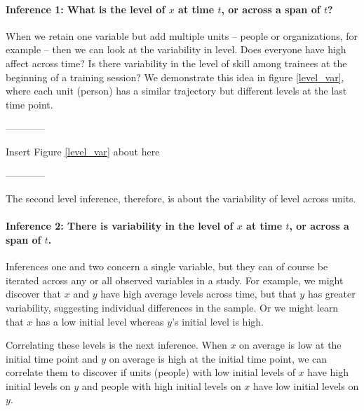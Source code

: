 \documentclass[]{article}
\let\oldparagraph\paragraph
\renewcommand{\paragraph}[1]{\oldparagraph{#1}\mbox{}}
\begin{document}
\hypertarget{inference-1-what-is-the-level-of-x-at-time-t-or-across-a-span-of-t}{%
\paragraph{\texorpdfstring{Inference 1: What is the level of \(x\) at
time \(t\), or across a span of
\(t\)?}{Inference 1: What is the level of x at time t, or across a span of t?}}\label{inference-1-what-is-the-level-of-x-at-time-t-or-across-a-span-of-t}}

When we retain one variable but add multiple units -- people or
organizations, for example -- then we can look at the variability in
level. Does everyone have high affect across time? Is there variability
in the level of skill among trainees at the beginning of a training
session? We demonstrate this idea in figure \ref{level_var}, where each
unit (person) has a similar trajectory but different levels at the last
time point.

\begin{center}

------------

Insert Figure \ref{level_var} about here

------------

\end{center}

\noindent The second level inference, therefore, is about the
variability of level across units.

\hypertarget{inference-2-there-is-variability-in-the-level-of-x-at-time-t-or-across-a-span-of-t.}{%
\paragraph{\texorpdfstring{Inference 2: There is variability in the
level of \(x\) at time \(t\), or across a span of
\(t\).}{Inference 2: There is variability in the level of x at time t, or across a span of t.}}\label{inference-2-there-is-variability-in-the-level-of-x-at-time-t-or-across-a-span-of-t.}}

Inferences one and two concern a single variable, but they can of course
be iterated across any or all observed variables in a study. For
example, we might discover that \(x\) and \(y\) have high average levels
across time, but that \(y\) has greater variability, suggesting
individual differences in the sample. Or we might learn that \(x\) has a
low initial level whereas \(y\)'s initial level is high.

Correlating these levels is the next inference. When \(x\) on average is
low at the initial time point and \(y\) on average is high at the
initial time point, we can correlate them to discover if units (people)
with low initial levels of \(x\) have high initial levels on \(y\) and
people with high initial levels on \(x\) have low initial levels on
\(y\).
\end{document}
